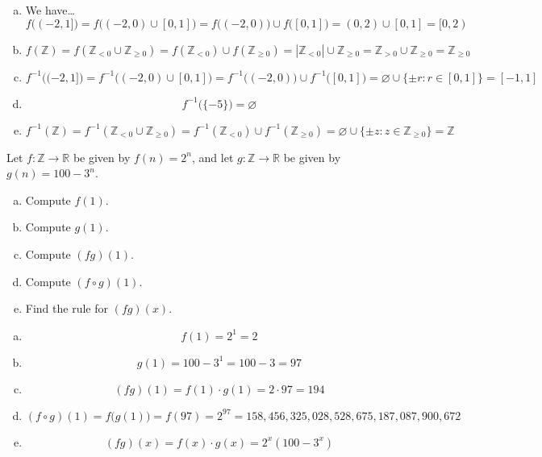 \documentclass[11pt,letterpaper]{article}
\begin{document}
\sol 
\begin{enumerate}[(a)]
\item We have\dots
	\[
	f\big( (-2, 1] \big)= f \big( (-2,0) \cup [0, 1] \big)= f\big( (-2, 0) \big) \cup f \big( [0, 1] \big)= (0, 2) \cup [0, 1]= [0, 2)
	\] \pspace

\item 
	\[
	f(\mathbb{Z})= f \left( \mathbb{Z}_{< 0} \cup \mathbb{Z}_{\geq 0} \right)=  f \left( \mathbb{Z}_{< 0} \right) \cup f \left( \mathbb{Z}_{\geq 0} \right)= |\mathbb{Z}_{< 0}| \cup \mathbb{Z}_{\geq 0}= \mathbb{Z}_{> 0} \cup \mathbb{Z}_{\geq 0}= \mathbb{Z}_{\geq 0}
	\] \pspace

\item 
	\[
	f^{-1} \big( (-2, 1] \big)= f^{-1} \big( (-2, 0) \cup [0, 1] \big)= f^{-1} \big( (-2, 0) \big) \cup f^{-1} \big( [0, 1] \big)= \varnothing \cup \{ \pm r \colon r \in [0, 1] \}= [-1, 1]
	\] \pspace

\item 
	\[
	f^{-1} \big( \{ -5 \} \big)= \varnothing
	\] \pspace

\item 
	\[
	f^{-1} (\mathbb{Z})= f^{-1} \left( \mathbb{Z}_{< 0} \cup \mathbb{Z}_{\geq 0} \right) = f^{-1} \left( \mathbb{Z}_{< 0} \right) \cup f^{-1} \left( \mathbb{Z}_{\geq 0} \right)= \varnothing \cup \{ \pm z \colon z \in \mathbb{Z}_{\geq 0} \}= \mathbb{Z}
	\]
\end{enumerate}



\newpage



 Let $f: \mathbb{Z} \to \mathbb{R}$ be given by $f(n)= 2^n$, and let $g: \mathbb{Z} \to \mathbb{R}$ be given by $g(n)= 100 - 3^n$. 
\begin{enumerate}[(a)]
\item Compute $f(1)$.
\item Compute $g(1)$.
\item Compute $(fg)(1)$.
\item Compute $(f \circ g)(1)$.
\item Find the rule for $(fg)(x)$.
\end{enumerate} \pspace

\sol 
\begin{enumerate}[(a)]
\item 
	\[
	f(1)= 2^1= 2
	\] \pspace

\item 
	\[
	g(1)= 100 - 3^1= 100 - 3= 97
	\] \pspace

\item 
	\[
	(fg)(1)= f(1) \cdot g(1)= 2 \cdot 97= 194
	\] \pspace

\item 
	\[
	(f \circ g)(1)= f \big( g(1) \big)= f(97)= 2^{97}= 158,\!456,\!325,\!028,\!528,\!675,\!187,\!087,\!900,\!672
	\] \pspace

\item 
	\[
	(fg)(x)= f(x) \cdot g(x)= 2^x (100 - 3^x)
	\]
\end{enumerate}
\end{document}
